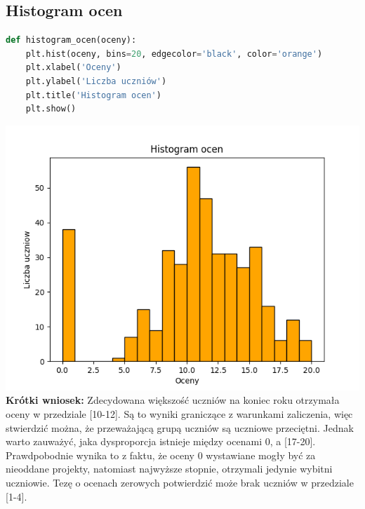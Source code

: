 \documentclass{article}
\begin{document}
\subsection{Histogram ocen}
\begin{lstlisting}[language=Python]
def histogram_ocen(oceny):
    plt.hist(oceny, bins=20, edgecolor='black', color='orange')
    plt.xlabel('Oceny')
    plt.ylabel('Liczba uczniów')
    plt.title('Histogram ocen')
    plt.show()
\end{lstlisting}
\includegraphics[width=\textwidth]{histogram_ocen.png}
\textbf{Krótki wniosek:} Zdecydowana większość uczniów na koniec roku otrzymała oceny w przedziale [10-12]. Są to wyniki graniczące z warunkami zaliczenia, więc stwierdzić można, że przeważającą grupą uczniów są uczniowe przeciętni. Jednak warto zauważyć, jaka dysproporcja istnieje między ocenami 0, a [17-20]. Prawdpobodnie wynika to z faktu, że oceny 0 wystawiane mogły być za nieoddane projekty, natomiast najwyższe stopnie, otrzymali jedynie wybitni uczniowie. Tezę o ocenach zerowych potwierdzić może brak uczniów w przedziale [1-4].
\vspace{15cm}
\end{document}
